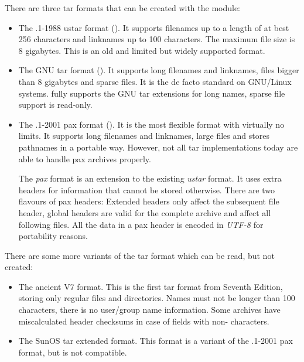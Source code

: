 There are three tar formats that can be created with the 
module:

\begin{itemize}

\item
The \POSIX{}.1-1988 ustar format (). It supports
filenames up to a length of at best 256 characters and linknames up to 100
characters. The maximum file size is 8 gigabytes. This is an old and limited
but widely supported format.

\item
The GNU tar format (). It supports long filenames and
linknames, files bigger than 8 gigabytes and sparse files. It is the de facto
standard on GNU/Linux systems.  fully supports the GNU tar
extensions for long names, sparse file support is read-only.

\item
The \POSIX{}.1-2001 pax format (). It is the most
flexible format with virtually no limits. It supports long filenames and
linknames, large files and stores pathnames in a portable way. However, not
all tar implementations today are able to handle pax archives properly.

The \emph{pax} format is an extension to the existing \emph{ustar} format. It
uses extra headers for information that cannot be stored otherwise. There are
two flavours of pax headers: Extended headers only affect the subsequent file
header, global headers are valid for the complete archive and affect all
following files. All the data in a pax header is encoded in \emph{UTF-8} for
portability reasons.

\end{itemize}

There are some more variants of the tar format which can be read, but not
created:

\begin{itemize}

\item
The ancient V7 format. This is the first tar format from \UNIX{} Seventh
Edition, storing only regular files and directories. Names must not be longer
than 100 characters, there is no user/group name information. Some archives
have miscalculated header checksums in case of fields with non-\ASCII{}
characters.

\item
The SunOS tar extended format. This format is a variant of the \POSIX{}.1-2001
pax format, but is not compatible.

\end{itemize}

